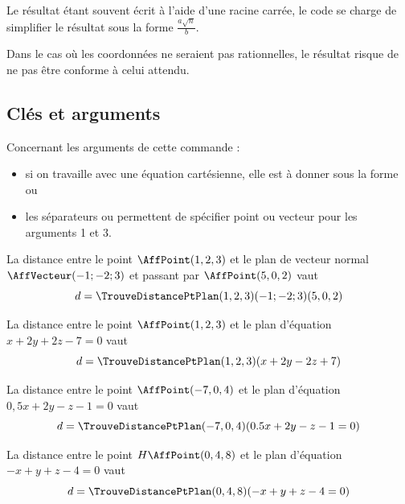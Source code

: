 \documentclass[a4paper,french,11pt]{article}
\newcommand\ctex[1]{\tcbox[vignettelatex]{#1}}
\begin{document}
\begin{noteblock}
Le résultat étant souvent écrit à l'aide d'une racine carrée, le code se charge de simplifier le résultat sous la forme $\frac{a\sqrt{n}}{b}$.

Dans le cas où les coordonnées ne seraient pas rationnelles, le résultat risque de ne pas être conforme à celui attendu.
\end{noteblock}

\subsection{Clés et arguments}

\begin{cautionblock}
Concernant les arguments de cette commande :

\begin{itemize}
	\item si on travaille avec une équation cartésienne, elle est à donner sous la forme \ctex{ax+by+cz=0} ou \ctex{ax+by+cz}
	\item les séparateurs \ctex{,} ou \ctex{;} permettent de spécifier point ou vecteur pour les arguments 1 et 3.
\end{itemize}
\vspace*{-\baselineskip}\leavevmode
\end{cautionblock}

\begin{PresCodePL}{}
La distance entre le point $\AffPoint(1,2,3)$ et le plan de vecteur normal $\AffVecteur(-1;-2;3)$ et passant par $\AffPoint(5,0,2)$ vaut
\[ d = \displaystyle\TrouveDistancePtPlan(1,2,3)(-1;-2;3)(5,0,2) \]
\end{PresCodePL}

\begin{PresCodePL}{}
La distance entre le point $\AffPoint(1,2,3)$ et le plan d'équation $x+2y+2z-7=0$ vaut
\[ d = \displaystyle\TrouveDistancePtPlan(1,2,3)(x+2y-2z+7) \]
\end{PresCodePL}

\begin{PresCodePL}{}
La distance entre le point $\AffPoint(-7,0,4)$ et le plan d'équation $0,5x+2y-z-1=0$ vaut
\[ d = \displaystyle\TrouveDistancePtPlan(-7,0,4)(0.5x+2y-z-1=0) \]
\end{PresCodePL}

\begin{PresCodePL}{}
La distance entre le point $H\AffPoint(0,4,8)$ et le plan d'équation $-x+y+z-4=0$ vaut
\[ d = \displaystyle\TrouveDistancePtPlan(0,4,8)(-x+y+z-4=0) \]
\end{PresCodePL}
\end{document}
